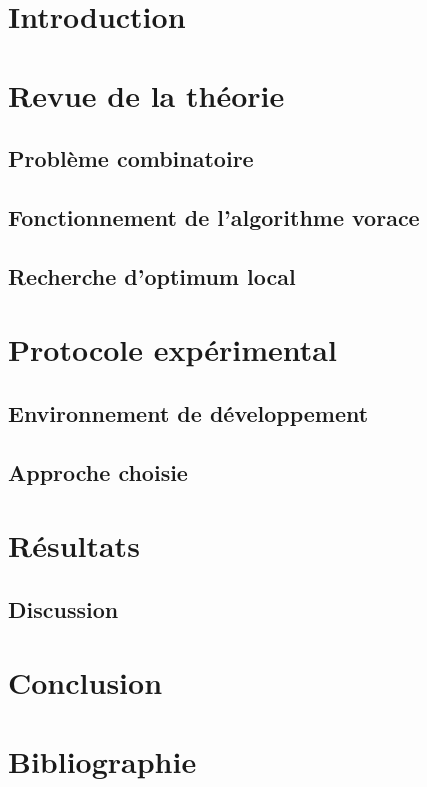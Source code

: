 \documentclass[10pt,a4paper]{article}
\begin{document}
\newpage

\hfill

\newpage

\tableofcontents

\newpage

\section{Introduction}

\section{Revue de la théorie}

\subsection{Problème combinatoire}

\subsection{Fonctionnement de l'algorithme vorace}

\subsection{Recherche d'optimum local}

\section{Protocole expérimental}

\subsection{Environnement de développement}

\subsection{Approche choisie}

\section{Résultats}

\subsection{Discussion}

\section{Conclusion}

\section{Bibliographie}
\end{document}
